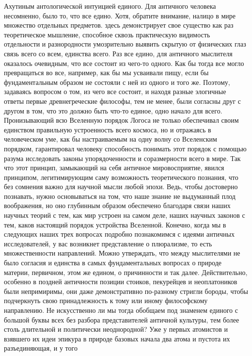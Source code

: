 Ахутиным антологической интуицией единого. Для античного человека несомненно,
было то, что все едино. Хотя, обратите внимание, налицо в мире множество
отдельных предметов. здесь демонстрирует свое существо как раз теоретическое
мышление, способное сквозь практическую видимость отдельности и разнородности
умозрительно выявить скрытую от физических глаз связь всего со всем, единства
всего. Раз все едино, для античного мыслителя оказалось очевидным, что все
состоит из чего-то одного. Как бы тогда все могло превращаться во все, например,
как бы мы усваивали пищу, если бы фундаментальным образом не состояли с ней из
одного и того же. Поэтому, задаваясь вопросом о том, из чего все состоит, и
находя разные элогичные ответы первые древнегреческие философы, тем не менее,
были согласны друг с другом в том, что это должно быть что-то единое, одно
начало для всего. Пронизывающий всю Вселенную порядок Логоса не только
обеспечивал своим единством правильную устроенность всего космоса, но и
отражаясь в человеческом уме, как бы настраиваемым на одну волну со Вселенским
порядком, гарантировал человеку способность понимать этот порядок с помощью
разума исследовать законы упорядоченности и соразмерности всего в мире. Так что
этот принцип, замыкающий на себя античное мировосприятие, явился принципом,
легитимирующим саму возможность теоретического познания, что без сомнения важно
для научной мысли любой эпохи. Ведь, чтобы достоверно познавать, нужно
основываться на том, что наше знание не выдуманный плод воображения, но оно
глубинным образом обеспечено благодаря связи наших научных теорий с тем, как мир
устроен на самом деле, наших научных законов с тем, каков настоящий порядок
устройства Вселенной. Конечно, когда мы в следующих наших трех вопросах подробно
познакомимся с идеями античных исследователей, у вас возникнет представление о
плюрализме, то есть множественности направлений. Можно утверждать, что между
мыслителями не было согласия и единства в самых фундаментальных вопросах о
природе материи, первичном, этом же едином, о причинности и так далее.
Действительно, особенно в поздней античности позиции стоиков, пекурейцев и
неоплатоников были непримиримы, они даже демонстративно по-разному стригли
бороды, чтобы подчеркнуть свою принадлежность к тому или иному философскому
направлению. Не искусственно ли мы тогда обобщаем под знаменем единого с большой
буквы всех без разбора представителей античной культуры, тем более столь
длительной и политически неоднородной? Уже у первых атомистов и взявшего их идеи
эпикура в природе базовых начала два атома и пустота их разъединяющая, и у того
